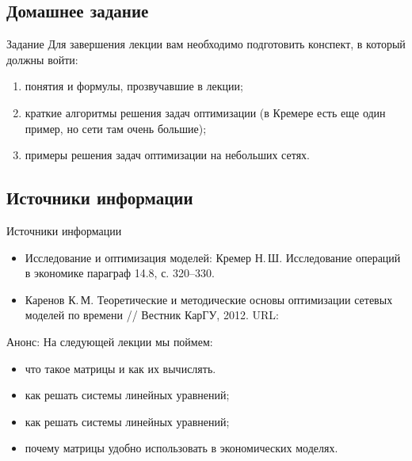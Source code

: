 \documentclass[unicode,11pt,notheorems]{beamer}
\begin{document}
\subsection{Домашнее задание}
\begin{frame}{Задание}
Для завершения лекции вам необходимо подготовить конспект, в который должны войти:
	\begin{enumerate}
		\item 
			понятия и формулы, прозвучавшие в лекции;
		\item 
			краткие алгоритмы решения задач оптимизации (в Кремере есть еще один пример, но сети там очень большие);
		\item 
			примеры решения задач оптимизации на небольших сетях.
	\end{enumerate}


\end{frame}

\subsection{Источники информации}
\begin{frame}{Источники информации}
\begin{itemize}
\item 
	Исследование и оптимизация моделей:  Кремер  Н.\,Ш. Исследование операций в экономике параграф 14.8, с. 320--330.

\item 
	Каренов  К.\,М. Теоретические и методические основы оптимизации сетевых моделей по времени // Вестник КарГУ, 2012. URL: 
	
\end{itemize}

\end{frame}

\begin{frame}{Анонс:}
	На следующей лекции мы поймем:
	\begin{itemize}
	\item 
		что такое матрицы и как их вычислять.
	\item 
		как решать системы линейных уравнений;
	\item 
		как решать системы линейных уравнений;
	\item 
		почему матрицы удобно использовать в экономических моделях.

	\end{itemize}

\end{frame}
\end{document}
